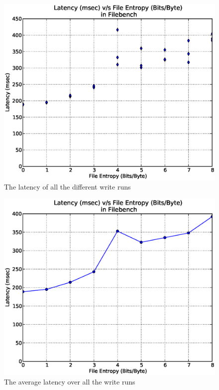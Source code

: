 \begin{figure}[H]
\begin{center}
\includegraphics[scale=.55]{../results/set1/write_latency_all.eps}
\caption{The latency of all the different write runs}
\label{fig:wl}
\end{center}
\end{figure}


\begin{figure}[H]
\begin{center}
\includegraphics[scale=.55]{../results/set1/write_latency_avg.eps}
\caption{The average latency over all the write runs}
\label{fig:wlavg}
\end{center}
\end{figure}
